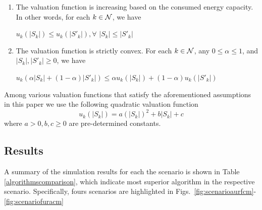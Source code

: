 \begin{enumerate}

\item
The valuation function is increasing based on the
consumed energy capacity. In other words, for each $k \in {\cal N}$, we have
\begin{center}
${u_k}({|S_k|}) \le {u_k}({{|S'_k|}}), \forall$   $ {|S_k|} \le {{|S'_k|}}$
\end{center}


\item The valuation function is strictly convex. For each  $k \in {\cal N} $, any $0 \le \alpha \le 1$, and ${|S_k|},{|S'_k|} \ge 0$, we have
\begin{center}
$u_k(\alpha |S_k| + (1 - \alpha)|S'_k|) \le \alpha u_k(|S_k|) + (1 - \alpha)u_k(|S'_k|)$
\end{center}
\end{enumerate}
\vspace{3mm}
Among various valuation functions that satisfy the aforementioned assumptions in this paper we use the following quadratic valuation function 
\begin{equation}
\label{eq:valuationfunction}
u_k({|S_k|}) = a({|S_k|})^2 + b{|S_k|} + c 
\end{equation}
where $a > 0, b, c \ge 0$ are pre-determined constants.\\

\fi


\vspace{-5pt}
\subsection{Results}



A summary of the simulation results for each the scenario is shown in Table \ref{algorithmscomparison}, which indicate most superior algorithm in the respective scenario. Specifically, fours scenarios are highlighted in Figs.~\ref{fig:scenarioaurfcm}-\ref{fig:scenariofuracm}

